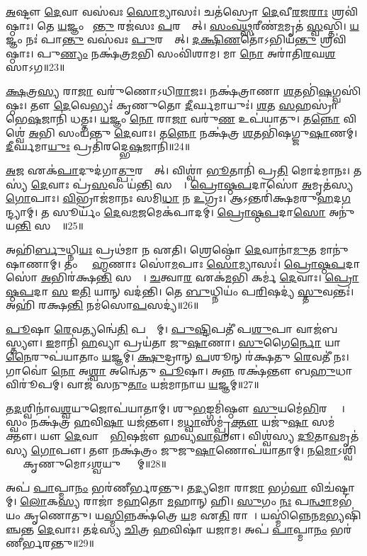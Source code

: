 \ul{𑌅}𑌷𑍍𑌟𑍗 \ul{𑌦𑍇}𑌵𑌾 𑌵𑌸॑𑌵𑌃 \ul{𑌸𑍋}𑌮𑍍𑌯𑌾𑌸𑌃॑। 
𑌚𑌤॑𑌸𑍍𑌰𑍋 \ul{𑌦𑍇}𑌵𑍀\ul{𑌰}𑌜\ul{𑌰𑌾𑌃} 𑌶𑍍𑌰𑌵𑌿॑𑌷𑍍𑌠𑌾𑌃। 
𑌤𑍇 \ul{𑌯}𑌜𑍍𑌞𑌂 𑌪𑌾᳚\ul{𑌨𑍍𑌤𑍁} 𑌰𑌜॑𑌸𑌃 \ul{𑌪}𑌰𑌸𑍍𑌤𑌾᳚𑌤𑍍। 
\ul{𑌸𑌂}\ul{𑌵}\ul{𑌥𑍍𑌸}𑌰𑍀𑌣॑\ul{𑌮}𑌮𑍃𑌤॑ \ul{𑌸𑍍𑌵}𑌸𑍍𑌤𑌿। 
\ul{𑌯}𑌜𑍍𑌞𑌂 𑌨𑌃॑ 𑌪𑌾\ul{𑌨𑍍𑌤𑍁} 𑌵𑌸॑𑌵𑌃 \ul{𑌪𑍁}𑌰𑌸𑍍𑌤𑌾᳚𑌤𑍍। 
\ul{𑌦}\ul{𑌕𑍍𑌷𑌿}\ul{𑌣}𑌤𑍋॑𑌽𑌭𑌿𑌯॑\ul{𑌨𑍍𑌤𑍁} 𑌶𑍍𑌰𑌵𑌿॑𑌷𑍍𑌠𑌾𑌃। 
𑌪𑍁\ul{𑌣𑍍𑌯𑌂} 𑌨𑌕𑍍𑌷॑𑌤𑍍𑌰\ul{𑌮}𑌭𑌿 𑌸𑌂𑌵𑌿॑𑌶𑌾𑌮। 
𑌮𑌾 \ul{𑌨𑍋} 𑌅𑌰𑌾॑𑌤𑌿\ul{𑌰}𑌘\ul{𑌶}\ul{}𑌸𑌾𑌽𑌗\snn{}॥23॥ 

\ul{𑌕𑍍𑌷}𑌤𑍍𑌰\ul{𑌸𑍍𑌯} 𑌰𑌾\ul{𑌜𑌾} 𑌵𑌰𑍁॑𑌣𑍋𑌽𑌧𑌿\ul{𑌰𑌾}𑌜𑌃। 
𑌨𑌕𑍍𑌷॑𑌤𑍍𑌰𑌾𑌣𑌾 \ul{𑌶}𑌤𑌭𑌿॑\ul{𑌷}𑌗𑍍𑌵𑌸𑌿॑𑌷𑍍𑌠𑌃। 
𑌤𑍗 \ul{𑌦𑍇}𑌵𑍇𑌭𑍍𑌯𑌃॑ 𑌕𑍃𑌣𑍁𑌤𑍋 \ul{𑌦𑍀}𑌰𑍍𑌘𑌮𑌾𑌯𑍁𑌃॑। 
\ul{𑌶}𑌤 \ul{𑌸}𑌹𑌸𑍍𑌰𑌾॑ 𑌭𑍇\ul{𑌷}𑌜𑌾𑌨𑌿॑ 𑌧𑌤𑍍𑌤𑌃। 
\ul{𑌯}𑌜𑍍𑌞𑌂 \ul{𑌨𑍋} 𑌰𑌾\ul{𑌜𑌾} 𑌵𑌰𑍁॑\ul{𑌣} 𑌉𑌪॑𑌯𑌾𑌤𑍁। 
𑌤\ul{𑌨𑍍𑌨𑍋} 𑌵𑌿𑌶𑍍𑌵𑍇॑ \ul{𑌅}𑌭𑌿 𑌸𑌂𑌯॑𑌨𑍍𑌤𑍁 \ul{𑌦𑍇}𑌵𑌾𑌃। 
𑌤\ul{𑌨𑍍𑌨𑍋} 𑌨𑌕𑍍𑌷॑𑌤𑍍𑌰 \ul{𑌶}𑌤𑌭𑌿॑𑌷𑌗𑍍𑌜𑍁\ul{𑌷𑌾}𑌣𑌮𑍍। 
\ul{𑌦𑍀}𑌰𑍍𑌘𑌮𑌾\ul{𑌯𑍁𑌃} 𑌪𑍍𑌰𑌤𑌿॑𑌰𑌦𑍍𑌭𑍇\ul{𑌷}𑌜𑌾𑌨𑌿॑॥24॥ 

\ul{𑌅}𑌜 𑌏𑌕॑\ul{𑌪𑌾}𑌦𑍁𑌦॑𑌗𑌾\ul{𑌤𑍍𑌪𑍁}𑌰𑌸𑍍𑌤𑌾᳚𑌤𑍍। 
𑌵𑌿𑌶𑍍𑌵𑌾॑ \ul{𑌭𑍂}𑌤𑌾𑌨𑌿॑ 𑌪𑍍𑌰\ul{𑌤𑌿} 𑌮𑍋𑌦॑𑌮𑌾𑌨𑌃। 
𑌤𑌸𑍍𑌯॑ \ul{𑌦𑍇}𑌵𑌾𑌃 𑌪𑍍𑌰॑\ul{𑌸}𑌵𑌂 𑌯॑\ul{𑌨𑍍𑌤𑌿} 𑌸𑌰𑍍𑌵𑍇᳚। 
\ul{𑌪𑍍𑌰𑍋}\ul{𑌷𑍍𑌠}\ul{𑌪}𑌦𑌾𑌸𑍋॑ \ul{𑌅}𑌮𑍃𑌤॑𑌸𑍍𑌯 \ul{𑌗𑍋}𑌪𑌾𑌃। 
\ul{𑌵𑌿}𑌭𑍍𑌰𑌾𑌜॑𑌮𑌾𑌨𑌃 𑌸𑌮𑌿\ul{𑌧𑌾} 𑌨 \ul{𑌉}𑌗𑍍𑌰𑌃। 
𑌆𑌽𑌨𑍍𑌤𑌰𑌿॑𑌕𑍍𑌷𑌮𑌰𑍁\ul{𑌹}𑌦\ul{𑌗}𑌨𑍍𑌦𑍍𑌯𑌾𑌮𑍍। 
𑌤 𑌸𑍂𑌰𑍍𑌯𑌂॑ \ul{𑌦𑍇}𑌵\ul{𑌮}𑌜𑌮𑍇𑌕॑𑌪𑌾𑌦𑌮𑍍। 
\ul{𑌪𑍍𑌰𑍋}\ul{𑌷𑍍𑌠}\ul{𑌪}𑌦𑌾\ul{𑌸𑍋} 𑌅𑌨𑍁॑𑌯\ul{𑌨𑍍𑌤𑌿} 𑌸𑌰𑍍𑌵𑍇᳚॥25॥ 

𑌅𑌹𑌿॑\ul{𑌰𑍍𑌬𑍁}𑌧𑍍𑌨𑌿\ul{𑌯𑌃} 𑌪𑍍𑌰𑌥॑𑌮𑌾 𑌨 𑌏𑌤𑌿। 
𑌶𑍍𑌰𑍇𑌷𑍍𑌠𑍋॑ \ul{𑌦𑍇}𑌵𑌾𑌨𑌾॑\ul{𑌮𑍁}𑌤 𑌮𑌾𑌨𑍁॑𑌷𑌾𑌣𑌾𑌮𑍍। 
𑌤𑌂 𑌬𑍍𑌰𑌾᳚\ul{𑌹𑍍𑌮}𑌣𑌾𑌃 𑌸𑍋॑\ul{𑌮}𑌪𑌾𑌃 \ul{𑌸𑍋}𑌮𑍍𑌯𑌾𑌸𑌃॑। 
\ul{𑌪𑍍𑌰𑍋}\ul{𑌷𑍍𑌠}\ul{𑌪}𑌦𑌾𑌸𑍋॑ \ul{𑌅}𑌭𑌿𑌰॑𑌕𑍍𑌷\ul{𑌨𑍍𑌤𑌿} 𑌸𑌰𑍍𑌵𑍇᳚। 
\ul{𑌚}𑌤𑍍𑌵𑌾\ul{𑌰} 𑌏𑌕॑\ul{𑌮}𑌭𑌿 𑌕𑌰𑍍𑌮॑ \ul{𑌦𑍇}𑌵𑌾𑌃। 
\ul{𑌪𑍍𑌰𑍋}\ul{𑌷𑍍𑌠}\ul{𑌪}𑌦𑌾 \ul{𑌸} 𑌇\ul{𑌤𑌿} 𑌯𑌾𑌨𑍍 𑌵𑌦॑𑌨𑍍𑌤𑌿। 
𑌤𑍇 \ul{𑌬𑍁}𑌧𑍍𑌨𑌿𑌯𑌂॑ 𑌪\ul{𑌰𑌿}𑌷𑌦𑍍𑌯॑ \ul{𑌸𑍍𑌤𑍁}𑌵𑌨𑍍𑌤𑌃॑। 
𑌅𑌹𑌿॑ 𑌰𑌕𑍍𑌷\ul{𑌨𑍍𑌤𑌿} 𑌨𑌮॑𑌸𑍋\ul{𑌪}𑌸𑌦𑍍𑌯॑॥26॥ 

\ul{𑌪𑍂}𑌷𑌾 \ul{𑌰𑍇}𑌵𑌤𑍍𑌯𑌨𑍍𑌵𑍇॑\ul{𑌤𑌿} 𑌪𑌨𑍍𑌥𑌾᳚𑌮𑍍। 
\ul{𑌪𑍁}\ul{𑌷𑍍𑌟𑌿}𑌪𑌤𑍀॑ 𑌪\ul{𑌶𑍁}𑌪𑌾 𑌵𑌾𑌜॑𑌬𑌸𑍍𑌤𑍍𑌯𑍗। 
\ul{𑌇}𑌮𑌾𑌨𑌿॑ \ul{𑌹}𑌵𑍍𑌯𑌾 𑌪𑍍𑌰𑌯॑𑌤𑌾 𑌜𑍁\ul{𑌷𑌾}𑌣𑌾। 
\ul{𑌸𑍁}𑌗𑍈\ul{𑌰𑍍𑌨𑍋} 𑌯𑌾\ul{𑌨𑍈}𑌰𑍁𑌪॑𑌯𑌾𑌤𑌾𑌂 \ul{𑌯}𑌜𑍍𑌞𑌮𑍍। 
\ul{𑌕𑍍𑌷𑍁}𑌦𑍍𑌰𑌾𑌨𑍍 \ul{𑌪}𑌶𑍂𑌨𑍍 𑌰॑𑌕𑍍𑌷𑌤𑍁 \ul{𑌰𑍇}𑌵𑌤𑍀॑ 𑌨𑌃। 
𑌗𑌾𑌵𑍋॑ \ul{𑌨𑍋} 𑌅\ul{𑌶𑍍𑌵𑌾}\ul{} 𑌅𑌨𑍍𑌵𑍇॑𑌤𑍁 \ul{𑌪𑍂}𑌷𑌾। 
𑌅\ul{𑌨𑍍𑌨}\ul{} 𑌰𑌕𑍍𑌷॑𑌨𑍍𑌤𑍗 𑌬\ul{𑌹𑍁}𑌧𑌾 𑌵𑌿𑌰𑍂॑𑌪𑌮𑍍। 
𑌵𑌾𑌜॑ 𑌸𑌨𑍁\ul{𑌤𑌾𑌂} 𑌯𑌜॑𑌮𑌾𑌨𑌾𑌯 \ul{𑌯}𑌜𑍍𑌞𑌮𑍍॥27॥ 

𑌤\ul{𑌦}𑌶𑍍𑌵𑌿𑌨𑌾॑𑌵\ul{𑌶𑍍𑌵}𑌯𑍁𑌜𑍋𑌪॑𑌯𑌾𑌤𑌾𑌮𑍍। 
𑌶𑍁\ul{𑌭}𑌙𑍍𑌗𑌮𑌿॑𑌷𑍍𑌠𑍗 \ul{𑌸𑍁}𑌯𑌮𑍇॑\ul{𑌭𑌿}𑌰𑌶𑍍𑌵𑍈𑌃᳚। 
𑌸𑍍𑌵𑌂 𑌨𑌕𑍍𑌷॑𑌤𑍍𑌰 \ul{𑌹}𑌵𑌿\ul{𑌷𑌾} 𑌯𑌜॑𑌨𑍍𑌤𑍗। 
𑌮\ul{𑌧𑍍𑌵𑌾}𑌸𑌮𑍍𑌪𑍃॑\ul{𑌕𑍍𑌤𑍗} 𑌯𑌜𑍁॑\ul{𑌷𑌾} 𑌸𑌮॑𑌕𑍍𑌤𑍗। 
𑌯𑍗 \ul{𑌦𑍇}𑌵𑌾𑌨𑌾𑌂᳚ \ul{𑌭𑌿}𑌷𑌜𑍗॑ 𑌹𑌵𑍍𑌯\ul{𑌵𑌾}𑌹𑍗। 
𑌵𑌿𑌶𑍍𑌵॑𑌸𑍍𑌯 \ul{𑌦𑍂}𑌤𑌾\ul{𑌵}𑌮𑍃𑌤॑𑌸𑍍𑌯 \ul{𑌗𑍋}𑌪𑍗। 
𑌤𑍗 𑌨𑌕𑍍𑌷॑𑌤𑍍𑌰𑌂 𑌜𑍁𑌜𑍁\ul{𑌷𑌾}𑌣𑍋𑌪॑𑌯𑌾𑌤𑌾𑌮𑍍। 
𑌨\ul{𑌮𑍋}𑌽𑌶𑍍𑌵𑌿𑌭𑍍𑌯𑌾𑌂᳚ 𑌕𑍃𑌣𑍁𑌮𑍋𑌽\ul{𑌶𑍍𑌵}𑌯𑍁𑌗𑍍𑌭𑍍𑌯𑌾᳚𑌮𑍍॥28॥ 

𑌅𑌪॑ \ul{𑌪𑌾}𑌪𑍍𑌮𑌾\ul{𑌨𑌂} 𑌭𑌰॑𑌣𑍀𑌰𑍍𑌭𑌰𑌨𑍍𑌤𑍁। 
𑌤\ul{𑌦𑍍𑌯}𑌮𑍋 𑌰𑌾\ul{𑌜𑌾} 𑌭𑌗॑\ul{𑌵𑌾}\an{} 𑌵𑌿𑌚॑𑌷𑍍𑌟𑌾𑌮𑍍। 
\ul{𑌲𑍋}𑌕\ul{𑌸𑍍𑌯} 𑌰𑌾𑌜𑌾॑ 𑌮\ul{𑌹}𑌤𑍋 \ul{𑌮}𑌹𑌾𑌨𑍍 𑌹𑌿। 
\ul{𑌸𑍁}𑌗𑌂 \ul{𑌨𑌃} 𑌪\ul{𑌨𑍍𑌥𑌾}𑌮𑌭॑𑌯𑌂 𑌕𑍃𑌣𑍋𑌤𑍁। 
𑌯\ul{𑌸𑍍𑌮𑌿}𑌨𑍍𑌨𑌕𑍍𑌷॑𑌤𑍍𑌰𑍇 \ul{𑌯}𑌮 𑌏\ul{𑌤𑌿} 𑌰𑌾𑌜𑌾᳚। 
𑌯𑌸𑍍𑌮𑌿॑𑌨𑍍𑌨𑍇𑌨\ul{𑌮}𑌭𑍍𑌯𑌷𑌿॑𑌞𑍍𑌚𑌨𑍍𑌤 \ul{𑌦𑍇}𑌵𑌾𑌃। 
𑌤𑌦॑𑌸𑍍𑌯 \ul{𑌚𑌿}𑌤𑍍𑌰 \ul{𑌹}𑌵𑌿𑌷𑌾॑ 𑌯𑌜𑌾𑌮। 
𑌅𑌪॑ \ul{𑌪𑌾}𑌪𑍍𑌮𑌾\ul{𑌨𑌂} 𑌭𑌰॑𑌣𑍀𑌰𑍍𑌭𑌰𑌨𑍍𑌤𑍁॥29॥ 

